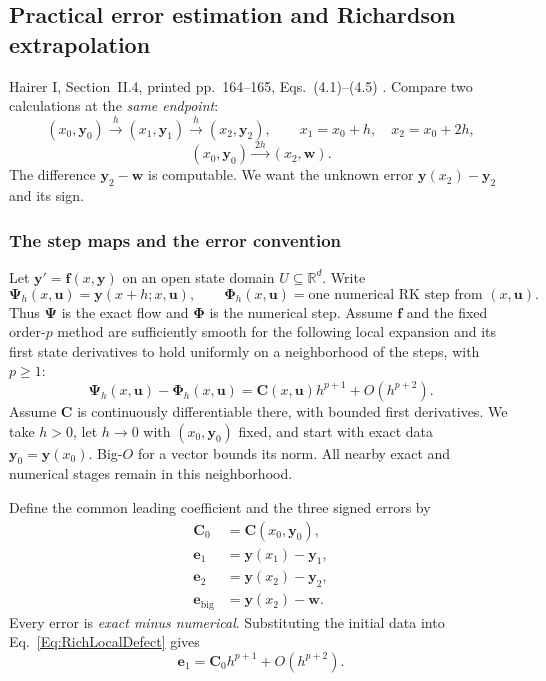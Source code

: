 \subsection{Practical error estimation and Richardson extrapolation}
\label{sec:RKRichardson}

Hairer I, Section~II.4, printed pp.~164--165, Eqs.~(4.1)--(4.5)
\cite{HNW1993}. Compare two calculations at the \emph{same endpoint}:
\[
 (x_0,\mathbf y_0)\xrightarrow{\ h\ }(x_1,\mathbf y_1)
                    \xrightarrow{\ h\ }(x_2,\mathbf y_2),
 \qquad x_1=x_0+h,\quad x_2=x_0+2h,
\]
\[
 (x_0,\mathbf y_0)\xrightarrow{\ 2h\ }(x_2,\mathbf w).
\]
The difference $\mathbf y_2-\mathbf w$ is computable. We want the unknown
error $\mathbf y(x_2)-\mathbf y_2$ and its sign.

\subsubsection{The step maps and the error convention}
Let $\mathbf y'=\mathbf f(x,\mathbf y)$ on an open state domain
$U\subseteq\mathbb R^d$. Write
\begin{equation}\label{Eq:RichStepMaps}
 \boldsymbol\Psi_h(x,\mathbf u)=\mathbf y(x+h;x,\mathbf u),
 \qquad
 \boldsymbol\Phi_h(x,\mathbf u)=\text{one numerical RK step from }(x,\mathbf u).
\end{equation}
Thus $\boldsymbol\Psi$ is the exact flow and $\boldsymbol\Phi$ is the numerical
step. Assume $\mathbf f$ and the fixed order-$p$ method are sufficiently smooth
for the following local expansion and its first state derivatives to hold
uniformly on a neighborhood of the steps, with $p\geq1$:
\begin{equation}\label{Eq:RichLocalDefect}
 \boldsymbol\Psi_h(x,\mathbf u)-\boldsymbol\Phi_h(x,\mathbf u)
 =\mathbf C(x,\mathbf u)h^{p+1}+O(h^{p+2}).
\end{equation}
Assume $\mathbf C$ is continuously differentiable there, with bounded first
derivatives. We take $h>0$, let $h\to0$ with $(x_0,\mathbf y_0)$ fixed, and
start with exact data $\mathbf y_0=\mathbf y(x_0)$. Big-$O$ for a vector bounds
its norm. All nearby exact and numerical stages remain in this neighborhood.

Define the common leading coefficient and the three signed errors by
\begin{equation}\label{Eq:RichErrors}
\begin{aligned}
 \mathbf C_0&=\mathbf C(x_0,\mathbf y_0),\\
 \mathbf e_1&=\mathbf y(x_1)-\mathbf y_1,\\
 \mathbf e_2&=\mathbf y(x_2)-\mathbf y_2,\\
 \mathbf e_{\mathrm{big}}&=\mathbf y(x_2)-\mathbf w.
\end{aligned}
\end{equation}
Every error is \emph{exact minus numerical}. Substituting the initial data into
Eq.~\ref{Eq:RichLocalDefect} gives
\begin{equation}\label{Eq:RichFirstError}
 \mathbf e_1=\mathbf C_0h^{p+1}+O(h^{p+2}).
\end{equation}

